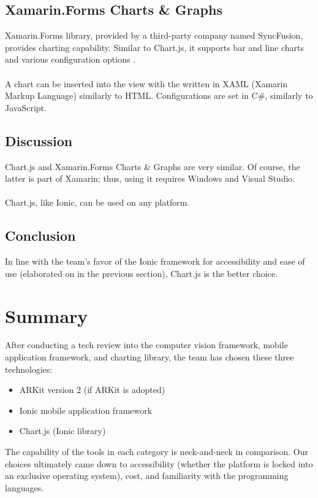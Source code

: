 \documentclass[onecolumn, draftclsnofoot,10pt, compsoc]{IEEEtran}
\begin{document}
\subsection{Xamarin.Forms Charts \& Graphs}
Xamarin.Forms library, provided by a third-party company named SyncFusion, provides charting capability. Similar to Chart.js, it supports bar and line charts and various configuration options \cite{xamarin_charts}.
\\\\
A chart can be inserted into the view with the written in XAML (Xamarin Markup Language) similarly to HTML. Configurations are set in C\#, similarly to JavaScript.

\subsection{Discussion}
Chart.js and Xamarin.Forms Charts \& Graphs are very similar. Of course, the latter is part of Xamarin; thus, using it requires Windows and Visual Studio.
\\\\
Chart.js, like Ionic, can be used on any platform.

\subsection{Conclusion}
In line with the team's favor of the Ionic framework for accessibility and ease of use (elaborated on in the previous section), Chart.js is the better choice.


\section{Summary}
After conducting a tech review into the computer vision framework, mobile application framework, and charting library, the team has chosen these three technologies:
\begin{itemize}
    \item ARKit version 2 (if ARKit is adopted)
    \item Ionic mobile application framework
    \item Chart.js (Ionic library)
\end{itemize}
    
\noindent The capability of the tools in each category is neck-and-neck in comparison. Our choices ultimately came down to accessibility (whether the platform is locked into an exclusive operating system), cost, and familiarity with the programming languages.



\end{document}

